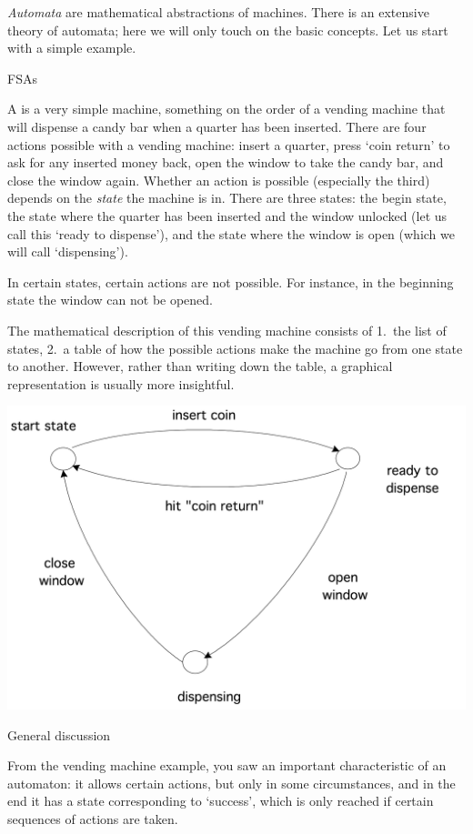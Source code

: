 
\emph{Automata} are mathematical abstractions of machines. 
There is an extensive theory of automata; here we will only touch on the basic concepts.
Let us start with a simple example.

 {\acfp{FSA}}

A  is a very simple machine, something on the order of
a vending machine that will dispense a candy bar when a
quarter has been inserted. There are four actions possible with a
vending machine: insert a quarter, press `coin return' to ask for any
inserted money back, open the window to take the candy bar, and close
the window again. Whether an action is possible (especially the third)
depends on the \emph{state} the machine is in. There are three states:
the begin state, the state where the quarter has been inserted and the
window unlocked (let us call this `ready to dispense'), and the state
where the window is open (which we will call `dispensing').

In certain states, certain
actions are not possible. For instance, in the beginning state the
window can not be opened.

The mathematical description of this vending machine consists of
1.~the list of states, 2.~a table of how the possible actions make the
machine go from one state to another. However, rather than writing
down the table, a graphical representation is usually more insightful.


\includegraphics[scale=.15]{graphics-public/fsa}

 {General discussion}

From the vending machine example, you saw an important characteristic of an automaton: 
it allows certain actions, but only in some circumstances, and in the end it has a 
state corresponding to `success', which is only reached if certain sequences of actions
are taken.

